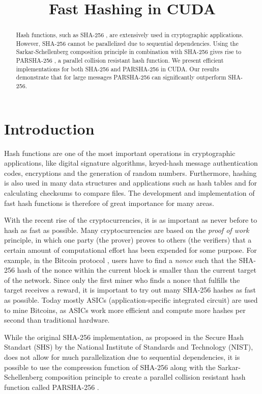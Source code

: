 \documentclass[letterpaper]{article}
\title{Fast Hashing in CUDA}
\begin{document}
%
\maketitle
%


\begin{abstract}
Hash functions, such as SHA-256 \cite{sha}, are extensively used in cryptographic applications.
However, SHA-256 cannot be parallelized due to sequential dependencies.
Using the Sarkar-Schellenberg composition principle \cite{sarkar} in combination with SHA-256 gives rise to PARSHA-256 \cite{parsha256}, a parallel collision resistant hash function. We present efficient implementations for both SHA-256 and  PARSHA-256 in CUDA. Our results demonstrate that for large messages PARSHA-256 can significantly outperform SHA-256.
\end{abstract}

\section{Introduction}\label{sec:intro}
Hash functions are one of the most important operations in cryptographic applications, like digital signature algorithms, keyed-hash message authentication codes, encryptions and the generation of random numbers. Furthermore, hashing is also used in many data structures and applications such as hash tables and for calculating checksums to compare files.  The development and implementation of fast hash functions is therefore of great importance for many areas.

With the recent rise of the cryptocurrencies, it is as important as never before to hash as fast as possible. Many cryptocurrencies are based on the \emph{proof of work} \cite{pow} principle, in which one party (the prover) proves to others (the verifiers) that a certain amount of computational effort has been expended for some purpose. For example, in the Bitcoin protocol \cite{nakamoto2012bitcoin}, users have to find a \emph{nonce} such that the SHA-256 hash of the nonce within the current block is smaller than the current target of the network. Since only the first miner who finds a nonce that fulfills the target receives a reward, it is important to try out many SHA-256 hashes as fast as possible. Today mostly ASICs (application-specific integrated circuit) are used to mine Bitcoins, as ASICs work more efficient and compute more hashes per second than traditional hardware.

While the original SHA-256 implementation, as proposed in the Secure Hash Standart (SHS) \cite{sha} by the National Institute of Standards and Technology (NIST), does not allow for much parallelization due to sequential dependencies, it is possible to use the compression function of SHA-256 along with the Sarkar-Schellenberg composition principle \cite{sarkar} to create a parallel collision resistant hash function called PARSHA-256 \cite{parsha256}. 
\end{document}
